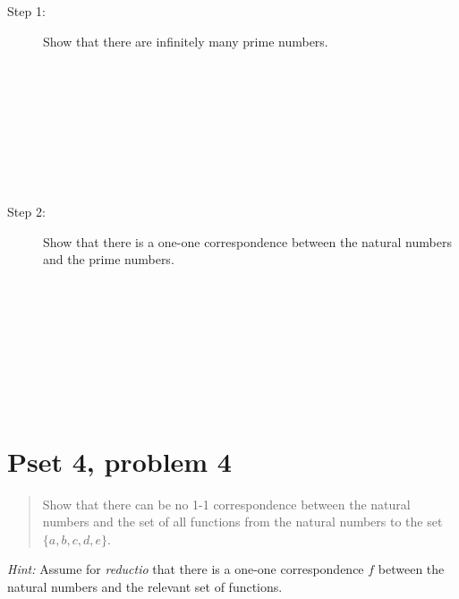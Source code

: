 \documentclass[justified]{tufte-handout}
\begin{document}
\begin{description}
\item[Step 1:] Show that there are infinitely many prime numbers.\\\\\\\\\\\\\\\\\
\item[Step 2:] Show that there is a one-one correspondence between the natural numbers and the prime numbers.\\\\\\\\\\\\\\\\\
\end{description}


\section{Pset 4, problem 4}

\begin{quote}
Show that there can be no 1-1 correspondence between the natural numbers and the set of all functions from the natural numbers to the set $\{a, b, c, d, e\}$.
\end{quote}

\noindent \emph{Hint:} Assume for \emph{reductio} that there is a one-one correspondence $f$ between the natural numbers and the relevant set of functions.
\end{document}

